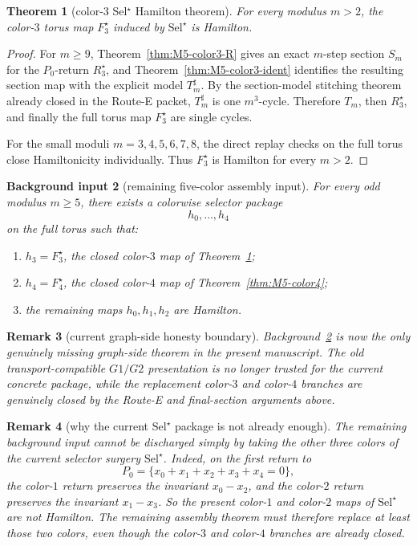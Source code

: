 \documentclass[11pt]{article}
\newtheorem{theorem}{Theorem}[section]
\newtheorem{background}[theorem]{Background input}
\newtheorem{remark}[theorem]{Remark}
\newcommand{\SelStar}{\mathrm{Sel}^{\star}}
\newcommand{\Pzero}{P_0}
\newcommand{\Ssec}{S_m}
\newcommand{\Tsharp}{T_m^{\sharp}}
\begin{document}
\begin{theorem}[color-$3$ Sel$^{\star}$ Hamilton theorem]
\label{thm:M5-color3}
For every modulus \(m>2\), the color-$3$ torus map \(F_3^\star\) induced by
\(\SelStar\) is Hamilton.
\end{theorem}

\begin{proof}
For \(m\ge 9\), Theorem~\ref{thm:M5-color3-R} gives an exact \(m\)-step section
\(\Ssec\) for the \(\Pzero\)-return \(R_3^\star\), and
Theorem~\ref{thm:M5-color3-ident} identifies the resulting section map with the
explicit model \(\Tsharp\).
By the section-model stitching theorem already closed in the Route-E packet,
\(\Tsharp\) is one \(m^3\)-cycle.  Therefore \(T_m\), then \(R_3^\star\), and
finally the full torus map \(F_3^\star\) are single cycles.

For the small moduli \(m=3,4,5,6,7,8\), the direct replay checks on the full
torus close Hamiltonicity individually.
Thus \(F_3^\star\) is Hamilton for every \(m>2\).
\end{proof}

\begin{background}[remaining five-color assembly input]
\label{bg:five-color-assembly}
For every odd modulus \(m\ge 5\), there exists a colorwise selector package
\[
h_0,\dots,h_4
\]
on the full torus such that:
\begin{enumerate}[label=\textup{(\arabic*)},leftmargin=2.8em]
\item \(h_3=F_3^\star\), the closed color-$3$ map of
      Theorem~\ref{thm:M5-color3};
\item \(h_4=F_4^\star\), the closed color-$4$ map of
      Theorem~\ref{thm:M5-color4};
\item the remaining maps \(h_0,h_1,h_2\) are Hamilton.
\end{enumerate}
\end{background}

\begin{remark}[current graph-side honesty boundary]
Background~\ref{bg:five-color-assembly} is now the only genuinely missing
graph-side theorem in the present manuscript.
The old transport-compatible \(G1/G2\) presentation is no longer trusted for
the current concrete package, while the replacement color-$3$ and color-$4$
branches are genuinely closed by the Route-E and final-section arguments above.
\end{remark}

\begin{remark}[why the current \(\SelStar\) package is not already enough]
The remaining background input cannot be discharged simply by taking the other
three colors of the current selector surgery \(\SelStar\).
Indeed, on the first return to
\[
\Pzero=\{x_0+x_1+x_2+x_3+x_4=0\},
\]
the color-$1$ return preserves the invariant \(x_0-x_2\), and the color-$2$
return preserves the invariant \(x_1-x_3\).
So the present color-$1$ and color-$2$ maps of \(\SelStar\) are not Hamilton.
The remaining assembly theorem must therefore replace at least those two colors,
even though the color-$3$ and color-$4$ branches are already closed.
\end{remark}
\end{document}
